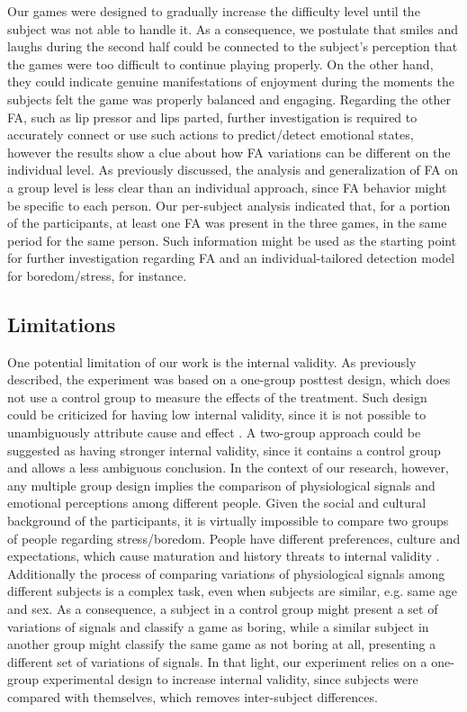 Our games were designed to gradually increase the difficulty level until the subject was not able to handle it. As a consequence, we postulate that smiles and laughs during the second half could be connected to the subject's perception that the games were too difficult to continue playing properly. On the other hand, they could indicate genuine manifestations of enjoyment during the moments the subjects felt the game was properly balanced and engaging. Regarding the other FA, such as lip pressor and lips parted, further investigation is required to accurately connect or use such actions to predict/detect emotional states, however the results show a clue about how FA variations can be different on the individual level. As previously discussed, the analysis and generalization of FA on a group level is less clear than an individual approach, since FA behavior might be specific to each person. Our per-subject analysis indicated that, for a portion of the participants, at least one FA was present in the three games, in the same period for the same person. Such information might be used as the starting point for further investigation regarding FA and an individual-tailored detection model for boredom/stress, for instance.

\subsection{Limitations}

One potential limitation of our work is the internal validity. As previously described, the experiment was based on a one-group posttest design, which does not use a control group to measure the effects of the treatment. Such design could be criticized for having low internal validity, since it is not possible to unambiguously attribute cause and effect \parencite{kirk1982experimental}. A two-group approach could be suggested as having stronger internal validity, since it contains a control group and allows a less ambiguous conclusion. In the context of our research, however, any multiple group design implies the comparison of physiological signals and emotional perceptions among different people. Given the social and cultural background of the participants, it is virtually impossible to compare two groups of people regarding stress/boredom. People have different preferences, culture and expectations, which cause maturation and history threats to internal validity \parencite{trochim2001research}. Additionally the process of comparing variations of physiological signals among different subjects is a complex task, even when subjects are similar, e.g. same age and sex. As a consequence, a subject in a control group might present a set of variations of signals and classify a game as boring, while a similar subject in another group might classify the same game as not boring at all, presenting a different set of variations of signals. In that light, our experiment relies on a one-group experimental design to increase internal validity, since subjects were compared with themselves, which removes inter-subject differences.

